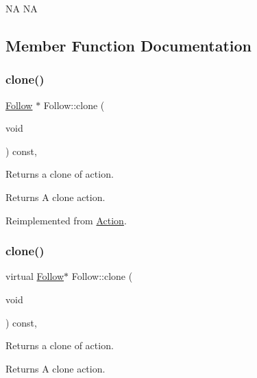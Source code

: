 NA  NA 

\subsection{Member Function Documentation}
\mbox{\label{classFollow_a52db9888349a5ae3c601a55c42586a65}} 
\subsubsection{\texorpdfstring{clone()}{clone()}\hspace{0.1cm}{\footnotesize\ttfamily [1/2]}}
{\footnotesize\ttfamily \hyperlink{classFollow}{Follow} $\ast$ Follow\+::clone (\begin{DoxyParamCaption}\item[{void}]{ }\end{DoxyParamCaption}) const\hspace{0.3cm}{\ttfamily [override]}, {\ttfamily [virtual]}}

Returns a clone of action.

\begin{DoxyReturn}{Returns}
A clone action. 
\end{DoxyReturn}


Reimplemented from \hyperlink{classAction_a6a047ad6b3bd200b0f86c7bb519b31ea}{Action}.

\mbox{\label{classFollow_a53e431827bb6b8735aacdf3abcceecc4}} 
\subsubsection{\texorpdfstring{clone()}{clone()}\hspace{0.1cm}{\footnotesize\ttfamily [2/2]}}
{\footnotesize\ttfamily virtual \hyperlink{classFollow}{Follow}$\ast$ Follow\+::clone (\begin{DoxyParamCaption}\item[{void}]{ }\end{DoxyParamCaption}) const\hspace{0.3cm}{\ttfamily [override]}, {\ttfamily [virtual]}}

Returns a clone of action.

\begin{DoxyReturn}{Returns}
A clone action. 
\end{DoxyReturn}


